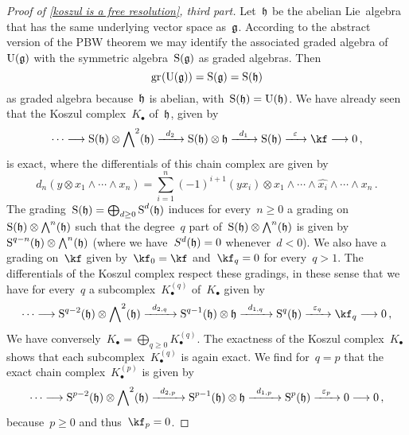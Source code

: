 \begin{proof}[Proof of \cref{koszul is a free resolution}, third part]
	Let~$\mathfrak{h}$ be the abelian Lie~algebra that has the same underlying vector space as~$\mathfrak{g}$.
	According to the abstract version of the PBW theorem we may identify the associated graded algebra of~$\operatorname{U}(\mathfrak{g})$ with the symmetric algebra~$\operatorname{S}(\mathfrak{g})$ as graded algebras.
	Then
	\[
		\gr(\Univ(\glie))
		=
		\Symm(\glie)
		=
		\Symm(\hlie)
	\]
	as graded algebra because~$\mathfrak{h}$ is abelian, with~$\operatorname{S}(\mathfrak{h}) = \operatorname{U}(\mathfrak{h})$.
	We have already seen that the Koszul complex~$K_\bullet$ of~$\mathfrak{h}$, given by
	\[
		\dotsb
		\to
		\Symm(\hlie) \otimes \Exterior^2(\hlie)
		\xto{d_2}
		\Symm(\hlie) \otimes \hlie
		\xto{d_1}
		\Symm(\hlie)
		\xto{\varepsilon}
		\kf
		\to
		0 \,,
	\]
	is exact, where the differentials of this chain complex are given by
	\[
		d_n( y \otimes x_1 \wedge \dotsb \wedge x_n)
		=
		\sum_{i=1}^n
		(-1)^{i+1} (y x_i) \otimes x_1 \wedge \dotsb \wedge \widehat{x_i} \wedge \dotsb \wedge x_n \,.
	\]
	The grading~$\operatorname{S}(\mathfrak{h}) = \bigoplus_{d \geq 0} \operatorname{S}^d(\mathfrak{h})$ induces for every~$n \geq 0$ a grading on~$\operatorname{S}(\mathfrak{h}) \otimes \operatorname{\bigwedge}^n(\mathfrak{h})$ such that the degree~$q$ part of~$\operatorname{S}(\mathfrak{h}) \otimes \operatorname{\bigwedge}^n(\mathfrak{h})$ is given by~$\operatorname{S}^{q-n}(\mathfrak{h}) \otimes \operatorname{\bigwedge}^n(\mathfrak{h})$ (where we have~$S^d(\mathfrak{h}) = 0$ whenever~$d < 0$).
	We also have a grading on~$\kf$ given by~$\kf_0 = \kf$ and~$\kf_q = 0$ for every~$q > 1$.
	The differentials of the Koszul complex respect these gradings, in these sense that we have for every~$q$ a subcomplex~$K^{(q)}_\bullet$ of~$K_\bullet$ given by
	\[
		\dotsb
		\to
		\Symm^{q-2}(\hlie) \otimes \Exterior^2(\hlie)
		\xto{d_{2,q}}
		\Symm^{q-1}(\hlie) \otimes \hlie
		\xto{d_{1,q}}
		\Symm^q(\hlie)
		\xto{\varepsilon_q}
		\kf_q
		\to
		0 \,,
	\]
	We have conversely~$K_\bullet = \bigoplus_{q \geq 0} K^{(q)}_\bullet$.
	The exactness of the Koszul complex~$K_\bullet$ shows that each subcomplex~$K^{(q)}_\bullet$ is again exact.
	We find for~$q = p$ that the exact chain complex~$K^{(p)}_\bullet$ is given by
	\[
		\dotsb
		\to
		\Symm^{p-2}(\hlie) \otimes \Exterior^2(\hlie)
		\xto{d_{2,p}}
		\Symm^{p-1}(\hlie) \otimes \hlie
		\xto{d_{1,p}}
		\Symm^p(\hlie)
		\xto{\varepsilon_p}
		0
		\to
		0 \,,
	\]
	because~$p \geq 0$ and thus~$\kf_p = 0$.


\end{proof}
